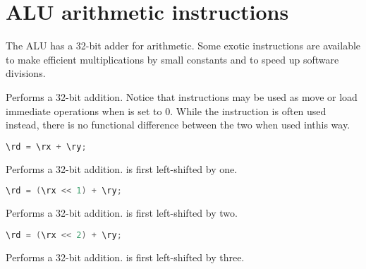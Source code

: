 
\section{ALU arithmetic instructions}


The \rvex{} ALU has a 32-bit adder for arithmetic. Some exotic instructions are
available to make efficient multiplications by small constants and to speed up
software divisions.

Performs a 32-bit addition. Notice that  instructions may be used as
move or load immediate operations when  is set to 0. While the 
instruction is often used instead, there is no functional difference between the
two when used inthis way.

\begin{lstlisting}[numbers=none, basicstyle=\ttfamily\footnotesize, language=C++]
\rd = \rx + \ry;
\end{lstlisting}

Performs a 32-bit addition. \code{\rx} is first left-shifted by one.

\begin{lstlisting}[numbers=none, basicstyle=\ttfamily\footnotesize, language=C++]
\rd = (\rx << 1) + \ry;
\end{lstlisting}

Performs a 32-bit addition. \code{\rx} is first left-shifted by two.

\begin{lstlisting}[numbers=none, basicstyle=\ttfamily\footnotesize, language=C++]
\rd = (\rx << 2) + \ry;
\end{lstlisting}

Performs a 32-bit addition. \code{\rx} is first left-shifted by three.

